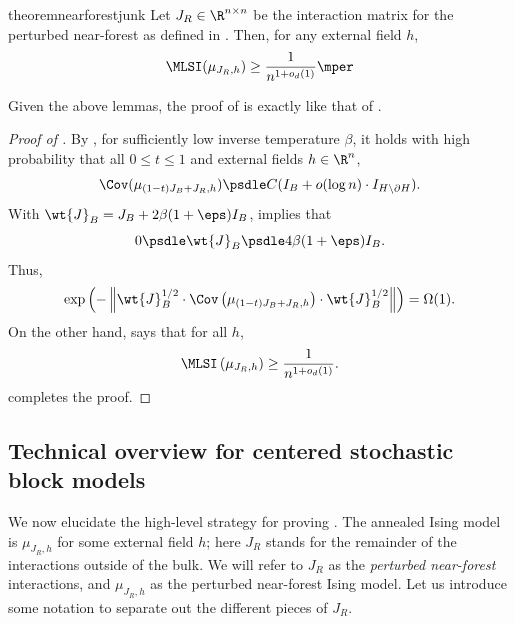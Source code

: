 \documentclass[11pt,letterpaper]{article}
\begin{document}
\begin{restatable}{theorem}{nearforestjunk}
    \label{thm:near-forest-junk-mlsi}
    Let $J_R \in \R^{n \times n}$ be the interaction matrix for the perturbed near-forest as defined in . Then, for any external field $h$,
    \[
        \MLSI(\mu_{J_R, h}) \ge \frac{1}{n^{1+o_d(1)}}\mper
    \]
\end{restatable}


Given the above lemmas, the proof of  is exactly like that of .

\begin{proof}[Proof of ]
    By , for sufficiently low inverse temperature $\beta$, it holds with high probability that all $0 \le t \le 1$ and external fields $h \in \R^n$,
    \[ \Cov(\mu_{(1-t)J_B+ J_R,h}) \psdle C(I_B + o(\log n) \cdot I_{H \setminus \partial H}). \]
    With $\wt{J}_B = J_B + 2\beta(1+\eps) I_B$,
     implies that 
    \[ 0 \psdle \wt{J}_B \psdle 4\beta(1+\eps) I_B. \]
    Thus,
    \[ \exp \left( - \left\| \wt{J}_B^{1/2} \cdot \Cov\left( \mu_{(1-t)J_B + J_R, h} \right) \cdot \wt{J}_B^{1/2} \right\| \right) = \Omega(1). \]
    On the other hand,  says that for all $h$,
    \[ \MLSI\left( \mu_{J_R,h} \right) \ge \frac{1}{n^{1+o_d(1)}}. \]
     completes the proof.
\end{proof}

\subsection{Technical overview for centered stochastic block models}

We now elucidate the high-level strategy for proving . 
The annealed Ising model is $\mu_{J_R, h}$ for some external field $h$; here $J_R$ stands for the remainder of the interactions outside of the bulk. 
We will refer to $J_R$ as the \emph{perturbed near-forest} interactions, and $\mu_{J_R, h}$ as the perturbed near-forest Ising model.
Let us introduce some notation to separate out the different pieces of $J_R$. 
\end{document}
